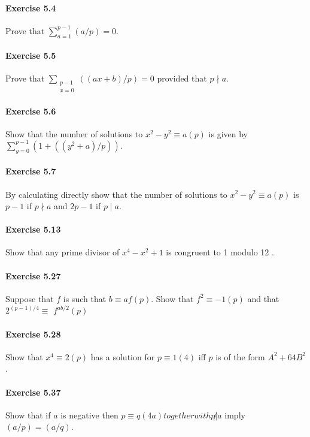 \documentclass{article}
\begin{document}
\paragraph{Exercise 5.4} Prove that $\sum_{a=1}^{p-1}(a / p)=0$.

\paragraph{Exercise 5.5} Prove that $\sum_{\substack{p-1 \\ x=0}}((a x+b) / p)=0$ provided that $p \nmid a .$

\paragraph{Exercise 5.6} Show that the number of solutions to $x^{2}-y^{2} \equiv a(p)$ is given by $\sum_{y=0}^{p-1}\left(1+\left(\left(y^{2}+a\right) / p\right)\right) .$

\paragraph{Exercise 5.7} By calculating directly show that the number of solutions to $x^{2}-y^{2} \equiv a(p)$ is $p-1$ if $p \nmid a$ and $2 p-1$ if $p \mid a$.

\paragraph{Exercise 5.13} Show that any prime divisor of $x^{4}-x^{2}+1$ is congruent to 1 modulo 12 .

\paragraph{Exercise 5.27} Suppose that $f$ is such that $b \equiv a f(p)$. Show that $f^{2} \equiv-1(p)$ and that $2^{(p-1) / 4} \equiv$ $f^{a b / 2}(p)$

\paragraph{Exercise 5.28} Show that $x^{4} \equiv 2(p)$ has a solution for $p \equiv 1(4)$ iff $p$ is of the form $A^{2}+64 B^{2}$.

\paragraph{Exercise 5.37} Show that if $a$ is negative then $p \equiv q(4 a) together with p\not | a$ imply $(a / p)=(a / q)$.
\end{document}
